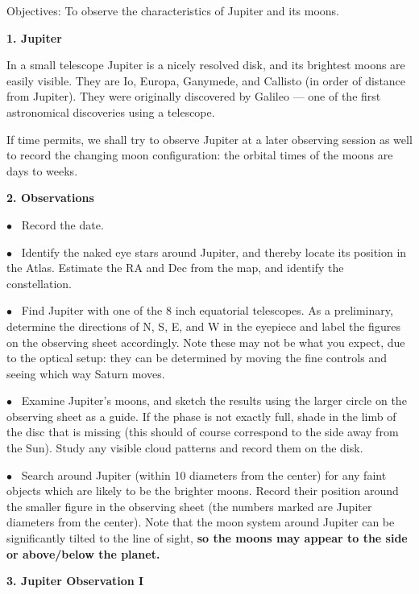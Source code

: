
\noindent
{Objectives:} To observe the characteristics of Jupiter and its moons.

\bigskip\noindent

\bigskip
\noindent
{\bf 1. Jupiter }

\medskip
\noindent
In a small telescope Jupiter is a nicely resolved disk, and its
brightest moons are easily visible. They are Io, Europa, Ganymede, and
Callisto (in order of distance from Jupiter). They were originally
discovered by Galileo --- one of the first astronomical discoveries
using a telescope.

If time permits, we shall try to observe Jupiter at a later observing
session as well to record the changing moon configuration: the orbital
times of the moons are days to weeks.

\bigskip
\noindent
{\bf 2. Observations}

\medskip
\noindent

\noindent $\bullet$ \ 
Record the date.

\medskip
\noindent $\bullet$ \ 
 Identify the naked eye stars around Jupiter, and thereby locate its 
position in the Atlas. Estimate the RA and Dec from the map,
and identify the constellation.

\medskip
\noindent $\bullet$ \ 
Find Jupiter with one of the 8 inch equatorial
telescopes.  As a preliminary, determine the directions of N, S, E,
and W in the eyepiece and label the figures on the observing sheet
accordingly. Note these may not be what you expect, due to the optical
setup: they can be determined by moving the fine controls and seeing
which way Saturn moves.

\medskip
\noindent $\bullet$ \ 
Examine Jupiter's moons, and sketch the results using the
larger circle on the observing sheet as a guide. If the phase is not exactly
full, shade in the limb of the disc that is missing (this should of
course correspond to the side away from the Sun). 
Study any visible cloud patterns and record them on the
disk.  

\medskip
\noindent $\bullet$ \ Search around Jupiter (within 10 diameters from
the center) for any faint objects which are likely to be the brighter
moons. Record their position around the smaller figure in the
observing sheet (the numbers marked are Jupiter diameters from the
center). Note that the moon system around Jupiter can be significantly
tilted to the line of sight, {\bf so the moons may appear to the side
  or above/below the planet.}

\newpage
\noindent
{\bf 3. Jupiter Observation I}
\bigskip\bigskip
\noindent

